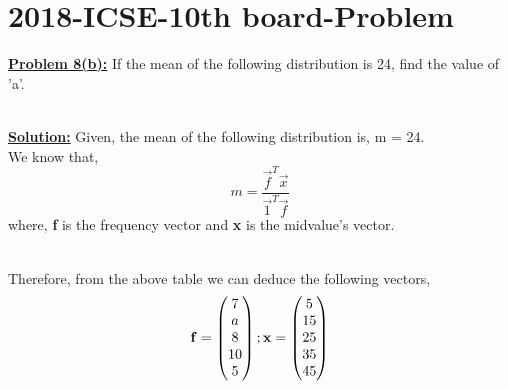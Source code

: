 \documentclass[journal,12pt,twocolumn]{IEEEtran}
\begin{document}
	\section{2018-ICSE-10th board-Problem}
\textbf{\underline{Problem 8(b):}} If the mean of the following distribution is 24, find the value of 'a'.
	\begin{table}[htb]
		\centering
	\end{table}\\
	\textbf{\underline{Solution:} }Given, the mean of the following distribution is, m = 24.\\
	We know that,
    \begin{equation} \label{eqn}
	    m = \frac{\vec{f}^T\vec{x}}{\vec{1}^T\vec{f}}
    \end{equation}
where, \textbf{f} is the frequency vector and \textbf{x} is the midvalue's vector. 
	\begin{table}[h!]
	\centering
\end{table}
\\
Therefore, from the above table we can deduce the following vectors,\\
	\begin{equation*}
		\mathbf{f} = \begin{pmatrix}7\\a\\8\\10\\5\end{pmatrix}
		; 
	\mathbf{x} = \begin{pmatrix}5\\15\\25\\35\\45\end{pmatrix}
	\end{equation*}
\end{document}
